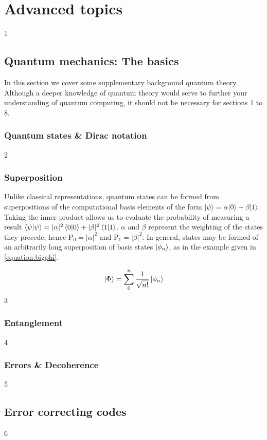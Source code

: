 \section{Advanced topics}
1
\subsection{Quantum mechanics: The basics}

In this section we cover some supplementary background quantum theory. Although a deeper knowledge of quantum theory would serve to further your understanding of quantum computing, it should not be necessary for sections 1 to 8. 

\subsubsection{Quantum states \& Dirac notation}
2
\subsubsection{Superposition}
Unlike classical representations, quantum states can be formed from superpositions of the computational basis elements of the form $|\psi\rangle = \alpha |0\rangle + \beta |1\rangle$. Taking the inner product allows us to evaluate the probability of measuring a result $\braket{\psi} = |\alpha|^{2} \braket{0}+|\beta|^{2}\braket{1}$. $\alpha$ and $\beta$ represent the weighting of the states they precede, hence P$_{0}=|\alpha|^{2}$ and P$_{1}=|\beta|^{2}$. In general, states may be formed of an arbitrarily long superposition of basis states $\left\vert{\phi_{n}}\right\rangle$, as in the example given in \ref{equation:bigphi}.

\begin{equation}
\left\vert{\Phi}\right\rangle = \sum_{0}^{n} \frac{1}{\sqrt{n!}}\left\vert{\phi_{n}}\right\rangle
\label{equation:bigphi}
\end{equation}
3
\subsubsection{Entanglement}
4 
\subsubsection{Errors \& Decoherence}
5 
\subsection{Error correcting codes}
6
\subsection{}
